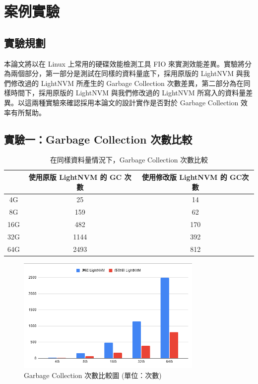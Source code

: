\chapter{案例實驗}
\section{實驗規劃}
\indent
本論文將以在 Linux 上常用的硬碟效能檢測工具 FIO 來實測效能差異。實驗將分為兩個部分，第一部分是測試在同樣的資料量底下，採用原版的 LightNVM 與我們修改過的 LightNVM 所產生的 Garbage Collection 次數差異，第二部分為在同樣時間下，採用原版的 LightNVM 與我們修改過的 LightNVM 所寫入的資料量差異。以這兩種實驗來確認採用本論文的設計實作是否對於 Garbage Collection 效率有所幫助。

\section{實驗一：Garbage Collection 次數比較}\label{s4.2}

\begin{table}[H]
    \begin{center}
        \caption{在同樣資料量情況下，Garbage Collection 次數比較}\label{t4.1}
        \begin{tabular}{|c|c|c|}\hline
                & 使用原版 LightNVM 的 GC 次數 & 使用修改版 LightNVM 的 GC次數 \\\hline
            4G  & 25                    & 14                    \\\hline
            8G  & 159                   & 62                    \\\hline
            16G & 482                   & 170                   \\\hline
            32G & 1144                  & 392                   \\\hline
            64G & 2493                  & 812                   \\\hline
        \end{tabular}
    \end{center}
\end{table}

\begin{figure}[H]
    \centering
    \includegraphics[width=0.8\textwidth]{picture/ch4/gc_chart.png}
    \caption{Garbage Collection 次數比較圖 (單位：次數)}
    \label{f4.1}
\end{figure}

